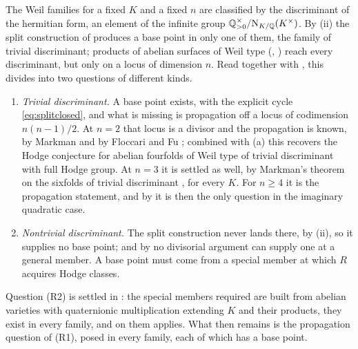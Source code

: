 \begin{remark}\label{rem:residualmap}
The Weil families for a fixed $K$ and a fixed $n$ are classified by the
discriminant of the hermitian form, an element of the infinite group
$\mathbb{Q}^{\times}_{>0}/\mathrm{N}_{K/\mathbb{Q}}(K^{\times})$. By (ii) the
split construction of  produces a base point in only one of
them, the family of trivial discriminant; products of abelian surfaces of
Weil type (, ) reach every discriminant,
but only on a locus of dimension $n$. Read together with
, this divides  into two questions of
different kinds.
\begin{enumerate}[label=\textup{(R\arabic*)},leftmargin=2.8em,itemsep=2pt]
\item \emph{Trivial discriminant.} A base point exists, with the explicit
  cycle \eqref{eq:splitclosed}, and what is missing is propagation off a locus
  of codimension $n(n-1)/2$. At $n=2$ that locus is a divisor and the
  propagation is known, by Markman \cite{Mar25a,Mar25b} and by Floccari and Fu
  \cite{FF26}; combined with (a) this recovers the Hodge
  conjecture for abelian fourfolds of Weil type of trivial discriminant with
  full Hodge group. At $n=3$ it is settled as well, by Markman's theorem on
  the sixfolds of trivial discriminant \cite{Mar25a,Mar25b}, for every $K$.
  For $n\ge4$ it is the propagation statement, and by 
  it is then the only question in the imaginary quadratic case.
\item \emph{Nontrivial discriminant.} The split construction never lands
  there, by (ii), so it supplies no base
  point; and by  no divisorial argument can supply one at
  a general member. A base point must come from a special member at which $R$
  acquires Hodge classes.
\end{enumerate}
Question (R2) is settled in : the special members
required are built from abelian varieties with quaternionic multiplication
extending $K$ and their products, they exist in every family, and on them
 applies. What then remains is the propagation
question of (R1), posed in every family, each of which has a base point.
\end{remark}

